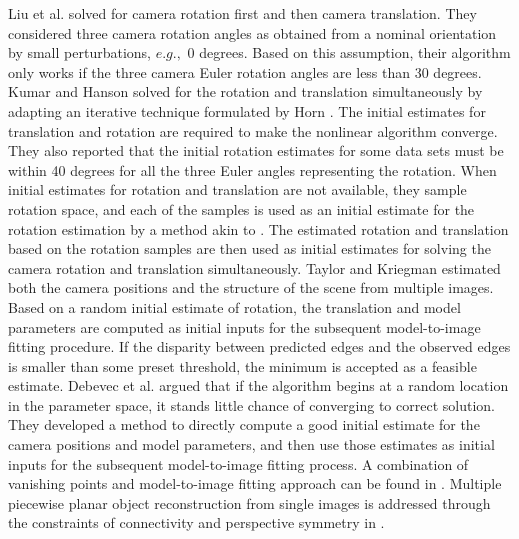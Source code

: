 Liu et al. \cite{Liu90} solved for camera rotation first and then  camera translation. They considered three camera rotation angles as obtained from a nominal orientation by small perturbations, $e.g.,$ 0 degrees. Based on this assumption, their algorithm only works if the three camera Euler rotation angles are less than 30 degrees. Kumar and Hanson \cite{Kumar94} solved for the rotation and translation simultaneously by adapting an iterative technique formulated by Horn \cite{bb88}. The initial estimates for translation and rotation are required to make the nonlinear algorithm converge. They also reported that the initial rotation estimates for some data sets must be within 40 degrees for all the three Euler angles representing the rotation. When initial estimates for rotation and translation are not available, they sample rotation space, and each of the samples is used as an initial estimate for the rotation estimation by a method akin to \cite{Liu90}. The estimated rotation and translation based on the rotation samples are then used as initial estimates for solving the camera rotation and translation simultaneously.
Taylor and Kriegman \cite{Taylor95} estimated both the camera positions and the structure of the scene from multiple images. Based on a random initial estimate of rotation, the translation and model parameters are computed as initial inputs for the subsequent model-to-image fitting procedure. If the disparity between predicted edges and the observed edges is smaller than some preset threshold, the minimum is accepted as a feasible estimate. Debevec et al. \cite{Debevec96} argued that if the algorithm begins at a random location in the parameter space, it stands little chance of converging to correct solution. They developed a method to directly compute a good initial estimate for the camera positions and model parameters, and then use those estimates as initial inputs for the subsequent model-to-image fitting process. A combination of vanishing points and model-to-image fitting approach can be found in  \cite{Jelinek01}. Multiple piecewise planar object reconstruction from single images is addressed through the constraints of connectivity and perspective symmetry in \cite{LiZG07}.

